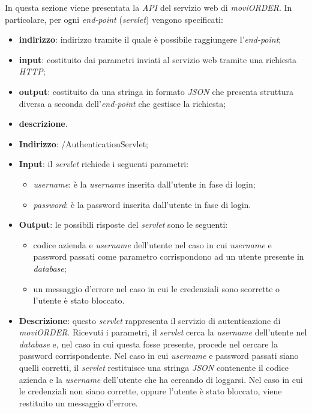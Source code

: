 In questa sezione viene presentata la \textit{API} del servizio web di \textit{moviORDER}. In particolare, per ogni \textit{end-point} (\textit{servlet}) vengono specificati:
\begin{itemize}
	\item \textbf{indirizzo}: indirizzo tramite il quale è possibile raggiungere l'\textit{end-point};
	\item \textbf{input}: costituito dai parametri inviati al servizio web tramite una richiesta \textit{HTTP};
	\item \textbf{output}: costituito da una stringa in formato \textit{JSON} che presenta struttura diversa a seconda dell'\textit{end-point} che gestisce la richiesta;
	\item \textbf{descrizione}.
\end{itemize}


\begin{itemize}
	\item \textbf{Indirizzo}: /AuthenticationServlet;
	\item \textbf{Input}: il \textit{servlet} richiede i seguenti parametri:
		\begin{itemize}
			\item \textit{username}: è la \textit{username} inserita dall'utente in fase di login;
			\item \textit{password}: è la password inserita dall'utente in fase di login.
		\end{itemize}
	\item \textbf{Output}: le possibili risposte del \textit{servlet} sono le seguenti:
		\begin{itemize}
			\item codice azienda e \textit{username} dell'utente nel caso in cui \textit{username} e password passati come parametro corrispondono ad un utente presente in \textit{database};
			\item un messaggio d'errore nel caso in cui le credenziali sono scorrette o l'utente è stato bloccato. 
		\end{itemize}
		\item \textbf{Descrizione}: questo \textit{servlet} rappresenta il servizio di autenticazione di \textit{moviORDER}. Ricevuti i parametri, il \textit{servlet} cerca la \textit{username} dell'utente nel \textit{database} e, nel caso in cui questa fosse presente, procede nel cercare la password corrispondente. Nel caso in cui \textit{username} e password passati siano quelli corretti, il \textit{servlet} restituisce una stringa \textit{JSON} contenente il codice azienda e la \textit{username} dell'utente che ha cercando di loggarsi. Nel caso in cui le credenziali non siano corrette, oppure l'utente è stato bloccato, viene restituito un messaggio d'errore.
\end{itemize}

